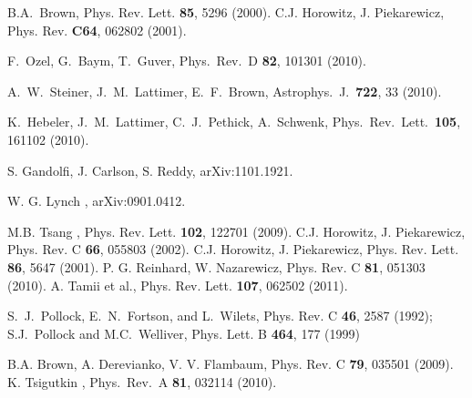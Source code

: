 B.A.~Brown, Phys. Rev. Lett. {\bf 85}, 5296 (2000). 
 C.J. Horowitz, J. Piekarewicz, Phys. Rev. {\bf C64}, 062802 (2001).

  F.~Ozel, G.~Baym, T.~Guver,
  Phys.\ Rev.\  D {\bf 82}, 101301 (2010).

  A.~W.~Steiner, J.~M.~Lattimer, E.~F.~Brown,
  Astrophys.\ J.\  {\bf 722}, 33 (2010).

  K.~Hebeler, J.~M.~Lattimer, C.~J.~Pethick, A.~Schwenk,
  Phys.\ Rev.\ Lett.\  {\bf 105}, 161102 (2010).

S. Gandolfi, J. Carlson, S. Reddy, arXiv:1101.1921.

 {
W. G. Lynch \etal,
arXiv:0901.0412.}

M.B. Tsang \etal, 
Phys. Rev. Lett. {\bf 102}, 122701 (2009). 
C.J. Horowitz, J. Piekarewicz, Phys. Rev. C {\bf 66}, 055803 (2002). 
C.J. Horowitz, J. Piekarewicz, Phys. Rev. Lett. {\bf 86},  5647 (2001).
P. G. Reinhard, W. Nazarewicz, Phys. Rev. C {\bf 81}, 051303 (2010).
 A. Tamii et al., Phys. Rev. Lett. {\bf 107}, 062502 (2011).

 S.~J.~Pollock, E.~N.~Fortson, and L.~Wilets,
Phys. Rev. C {\bf 46}, 2587 (1992); S.J.~Pollock and M.C.~Welliver, Phys.
Lett. B {\bf 464}, 177 (1999)

 B.A. Brown, A. Derevianko, V. V. Flambaum, Phys. Rev. C {\bf 79}, 035501 (2009).
K. Tsigutkin \etal, 
  Phys.\ Rev.\  A {\bf 81}, 032114 (2010).

